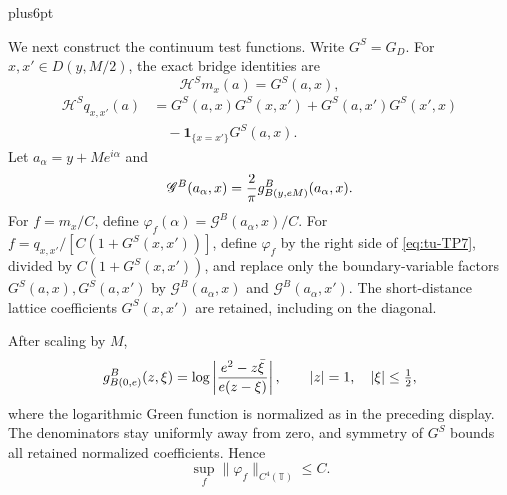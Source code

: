 \documentclass[12pt,reqno]{amsart}
\makeatletter
\theoremstyle{plain}
\theoremstyle{definition}
\theoremstyle{remark}
\renewenvironment{proof}[1][\proofname]{%
  \par
  \pushQED{\qed}%
  \normalfont
  \topsep6pt plus6pt\relax
  \trivlist
  \item[\hskip\labelsep\slshape #1\@addpunct{.}]%
  \ignorespaces
}{%
  \popQED
  \endtrivlist
  \@endpefalse
}
\DeclareRobustCommand{\qed}{%
  \leavevmode\unskip\penalty9999\hbox{}\nobreak
  \ifmmode
    \makebox[0pt][l]{\qquad\hbox{\qedsymbol}}%
  \else
    \qquad\hbox{\qedsymbol}%
  \fi
}
\renewcommand{\qedsymbol}{\rule[.47pt]{4pt}{6pt}}
\numberwithin{equation}{section}
\makeatother
\begin{document}
\begin{proof}[Proof of Lemma~\ref{lem:typed-centered-endpoint-product}]
We next construct the continuum test functions.  Write \(G^S=G_D\).
For \(x,x'\in D(y,M/2)\), the exact bridge identities are
\begin{equation}
 \mathcal{H}^Sm_x(a)=G^S(a,x),                               \label{eq:tu-TP6}
\end{equation}
\begin{equation}
 \begin{split}
 \mathcal{H}^Sq_{x,x'}(a)
 &=G^S(a,x)G^S(x,x')+G^S(a,x')G^S(x',x)\\
 &\quad-\mathbf1_{\{x=x'\}}G^S(a,x).
 \end{split}                                               \label{eq:tu-TP7}
\end{equation}
Let \(a_\alpha=y+Me^{i\alpha}\) and
\[
       \mathscr G^B(a_\alpha,x)={2\over\pi}
              g_{B(y,eM)}^B(a_\alpha,x).
\]
For \(f=m_x/C\), define
\(\varphi_f(\alpha)=\mathscr G^B(a_\alpha,x)/C\).  For
\(f=q_{x,x'}/[C(1+G^S(x,x'))]\), define \(\varphi_f\) by the right side
of \eqref{eq:tu-TP7}, divided by \(C(1+G^S(x,x'))\), and replace only the boundary-variable factors
\(G^S(a,x),G^S(a,x')\) by \(\mathscr G^B(a_\alpha,x)\) and
\(\mathscr G^B(a_\alpha,x')\).  The short-distance lattice coefficients
\(G^S(x,x')\) are retained, including on the diagonal.

After scaling by \(M\),
\begin{equation}
 g_{B(0,e)}^B(z,\xi)=\log\left|{e^2-z\bar\xi\over e(z-\xi)}\right|,
       \qquad |z|=1,\quad|\xi|\le\tfrac12,               \label{eq:tu-TP8}
\end{equation}
where the logarithmic Green function is normalized as in the preceding
display. The denominators stay uniformly
away from zero, and symmetry of \(G^S\) bounds all retained normalized
coefficients.  Hence
\begin{equation}
                  \sup_f\|\varphi_f\|_{C^4(\mathbb T)}\le C.          \label{eq:tu-TP9}
\end{equation}


\end{proof}
\end{document}
